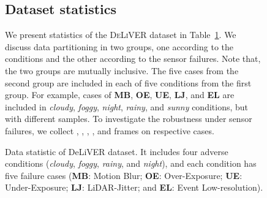\documentclass[10pt,twocolumn,letterpaper]{article}
\begin{document}
\begin{figure}[!t]
{\subsection{Dataset statistics}
\begin{table*}
\centering
\caption{Data statistic of DeLiVER dataset. It includes four adverse conditions (\emph{cloudy}, \emph{foggy}, \emph{rainy}, and \emph{night}), and each condition has five failure cases (\textbf{MB}: Motion Blur; \textbf{OE}: Over-Exposure; \textbf{UE}: Under-Exposure; \textbf{LJ}: LiDAR-Jitter; and \textbf{EL}: Event Low-resolution).}
\label{tab:sup_deliver_stat}
\end{table*} We present statistics of the \textsc{DeLiVER} dataset in Table~\ref{tab:sup_deliver_stat}. We discuss data partitioning in two groups, one according to the conditions and the other according to the sensor failures. Note that, the two groups are mutually inclusive. The five cases from the second group are included in each of five conditions from the first group. For example, cases of \textbf{MB}, \textbf{OE}, \textbf{UE}, \textbf{LJ}, and \textbf{EL} are included in \textit{cloudy}, \textit{foggy}, \textit{night}, \textit{rainy}, and \textit{sunny} conditions, but with different samples. To investigate the robustness under sensor failures, we collect , , , , and  frames on respective cases.

}
\end{figure}
\end{document}
